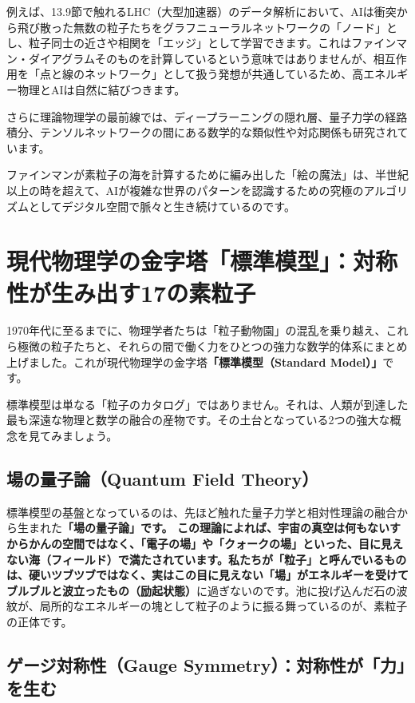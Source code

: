 例えば、13.9節で触れるLHC（大型加速器）のデータ解析において、AIは衝突から飛び散った無数の粒子たちをグラフニューラルネットワークの「ノード」とし、粒子同士の近さや相関を「エッジ」として学習できます。これはファインマン・ダイアグラムそのものを計算しているという意味ではありませんが、相互作用を「点と線のネットワーク」として扱う発想が共通しているため、高エネルギー物理とAIは自然に結びつきます。

さらに理論物理学の最前線では、ディープラーニングの隠れ層、量子力学の経路積分、テンソルネットワークの間にある数学的な類似性や対応関係も研究されています。

ファインマンが素粒子の海を計算するために編み出した「絵の魔法」は、半世紀以上の時を超えて、AIが複雑な世界のパターンを認識するための究極のアルゴリズムとしてデジタル空間で脈々と生き続けているのです。

\section{現代物理学の金字塔「標準模型」：対称性が生み出す17の素粒子}

1970年代に至るまでに、物理学者たちは「粒子動物園」の混乱を乗り越え、これら極微の粒子たちと、それらの間で働く力をひとつの強力な数学的体系にまとめ上げました。これが現代物理学の金字塔\textbf{「標準模型（Standard Model）」}です。

標準模型は単なる「粒子のカタログ」ではありません。それは、人類が到達した最も深遠な物理と数学の融合の産物です。その土台となっている2つの強大な概念を見てみましょう。

\subsection{場の量子論（Quantum Field Theory）}

標準模型の基盤となっているのは、先ほど触れた量子力学と相対性理論の融合から生まれた\textbf{「場の量子論」です。 この理論によれば、宇宙の真空は何もないすからかんの空間ではなく、「電子の場」や「クォークの場」といった、目に見えない海（フィールド）で満たされています。私たちが「粒子」と呼んでいるものは、硬いツブツブではなく、実はこの目に見えない「場」がエネルギーを受けてブルブルと波立ったもの（励起状態）}に過ぎないのです。池に投げ込んだ石の波紋が、局所的なエネルギーの塊として粒子のように振る舞っているのが、素粒子の正体です。

\subsection{ゲージ対称性（Gauge Symmetry）：対称性が「力」を生む}

